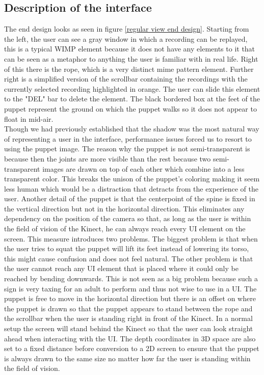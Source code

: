 \subsection{Description of the interface}

The end design looks as seen in figure \ref{regular view end design}. Starting from the left, the user can see a gray window in which a recording can be replayed, this is a typical WIMP element because it does not have any elements to it that can be seen as a metaphor to anything the user is familiar with in real life. Right of this there is the rope, which is a very distinct mime pattern element. Further right is a simplified version of the scrollbar containing the recordings with the currently selected recording highlighted in orange. The user can slide this element to the "DEL" bar to delete the element. The black bordered box at the feet of the puppet represent the ground on which the puppet walks so it does not appear to float in mid-air.\\

Though we had previously established that the shadow was the most natural way of representing a user in the interface, performance issues forced us to resort to using the puppet image. The reason why the puppet is not semi-transparent is because then the joints are more visible than the rest because two semi-transparent images are drawn on top of each other which combine into a less transparent color. This breaks the unison of the puppet's coloring making it seem less human which would be a distraction that detracts from the experience of the user. Another detail of the puppet is that the centerpoint of the spine is fixed in the vertical direction but not in the horizontal direction. This eliminates any dependency on the position of the camera so that, as long as the user is within the field of vision of the Kinect, he can always reach every UI element on the screen. This measure introduces two  problems. The biggest problem is that when the user tries to squat the puppet will lift its feet instead of lowering its torso, this might cause confusion and does not feel natural. The other problem is that the user cannot reach any UI element that is placed where it could only be reached by bending downwards. This is not seen as a big problem because such a sign is very taxing for an adult to perform and thus not wise to use in a UI. The puppet is free to move in the horizontal direction but there is an offset on where the puppet is drawn so that the puppet appears to stand between the rope and the scrollbar when the user is standing right in front of the Kinect. In a normal setup the screen will stand behind the Kinect so that the user can look straight ahead when interacting with the UI. The depth coordinates in 3D space are also set to a fixed distance before conversion to a 2D screen to ensure that the puppet is always drawn to the same size no matter how far the user is standing within the field of vision.\\

